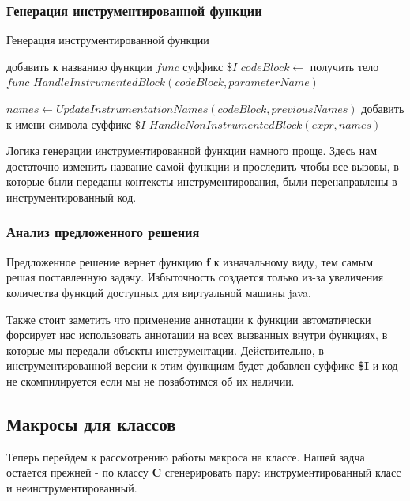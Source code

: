 \subsubsection{Генерация инструментированной функции}

\begin{algorithm}
\caption{Генерация инструментированной функции}\label{alg:ins}
\begin{algorithmic}[1]
  \State добавить к названию функции $func$ суффикс $\$I$
  \State $codeBlock \gets$ получить тело $func$
  \State $HandleInstrumentedBlock(codeBlock, parameterName)$
\EndFunction

  \State $names \gets UpdateInstrumentationNames(codeBlock, previousNames)$
      \State добавить к имени символа суффикс $\$I$
      \State $HandleNonInstrumentedBlock(expr, names)$
    \EndIf
  \EndFor
\EndFunction
\end{algorithmic}
\end{algorithm}


Логика генерации инструментированной функции намного проще.
Здесь нам достаточно изменить название самой функции и проследить чтобы все
вызовы, в которые были переданы контексты инструментирования, были
перенаправлены в инструментированный код.

\subsubsection{Анализ предложенного решения}

Предложенное решение вернет функцию \textbf{f} к изначальному виду, тем самым
решая поставленную задачу.
Избыточность создается только из-за увеличения количества функций
доступных для виртуальной машины java.

Также стоит заметить что применение аннотации к функции автоматически форсирует
нас использовать аннотации на всех вызванных внутри функциях, в которые мы передали
объекты инструментации.
Действительно, в инструментированной версии к этим функциям будет добавлен
суффикс \textbf{\$I} и код не скомпилируется если мы не позаботимся об их наличии.

\subsection{Макросы для классов}
\label{sec:macroClass}
Теперь перейдем к рассмотрению работы макроса на классе.
Нашей задча остается прежней - по классу \textbf{C} сгенерировать пару:
инструментированный класс и неинструментированный.

